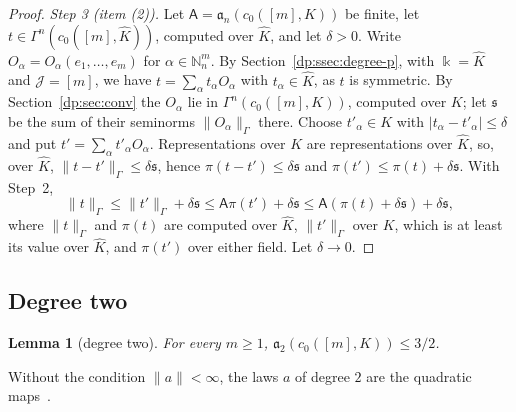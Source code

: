 \documentclass[11pt]{amsart}
\newtheorem{lemma}[theorem]{Lemma}
\theoremstyle{definition}
\theoremstyle{remark}
\numberwithin{equation}{section}
\newcommand{\N}{\mathbb N}
\newcommand{\abs}[1]{\lvert #1\rvert}
\newcommand{\norm}[1]{\lVert #1\rVert}
\newcommand{\Kh}{\widehat K}
\theoremstyle{plain}
\theoremstyle{definition}
\theoremstyle{plain}
\begin{document}
\begin{proof}
\emph{Step 3 (item (2)).} Let $\mathsf A=\mathfrak a_n(c_0([m],K))$ be finite, let $t\in\Gamma^n(c_0([m],\Kh))$, computed over $\Kh$, and let $\delta>0$. Write $O_\alpha=O_\alpha(e_1,\dots,e_m)$ for $\alpha\in\N^m_n$. By Section~\ref{dp:ssec:degree-p}, with $\Bbbk=\Kh$ and $\mathcal J=[m]$, we have $t=\sum_\alpha t_\alpha O_\alpha$ with $t_\alpha\in\Kh$, as $t$ is symmetric. By Section~\ref{dp:sec:conv} the $O_\alpha$ lie in $\Gamma^n(c_0([m],K))$, computed over $K$; let $\mathfrak s$ be the sum of their seminorms $\norm{O_\alpha}_\Gamma$ there. Choose $t'_\alpha\in K$ with $\abs{t_\alpha-t'_\alpha}\le\delta$ and put $t'=\sum_\alpha t'_\alpha O_\alpha$. Representations over $K$ are representations over $\Kh$, so, over $\Kh$, $\norm{t-t'}_\Gamma\le\delta\mathfrak s$, hence $\pi(t-t')\le\delta\mathfrak s$ and $\pi(t')\le\pi(t)+\delta\mathfrak s$. With Step~2,
\[
 \norm t_\Gamma\le\norm{t'}_\Gamma+\delta\mathfrak s\le\mathsf A\pi(t')+\delta\mathfrak s\le\mathsf A(\pi(t)+\delta\mathfrak s)+\delta\mathfrak s,
\]
where $\norm t_\Gamma$ and $\pi(t)$ are computed over $\Kh$, $\norm{t'}_\Gamma$ over $K$, which is at least its value over $\Kh$, and $\pi(t')$ over either field. Let $\delta\to0$.
\end{proof}

\subsection{Degree two}\label{dp:ac:degree-two}

\begin{lemma}[degree two]\label{dp:lem:degree-two}
For every $m\ge1$, $\mathfrak a_2(c_0([m],K))\le3/2$.
\end{lemma}

Without the condition $\norm a<\infty$, the laws $a$ of degree $2$ are the quadratic maps~\cite[Prop.~II.1]{Ro}.
\end{document}
